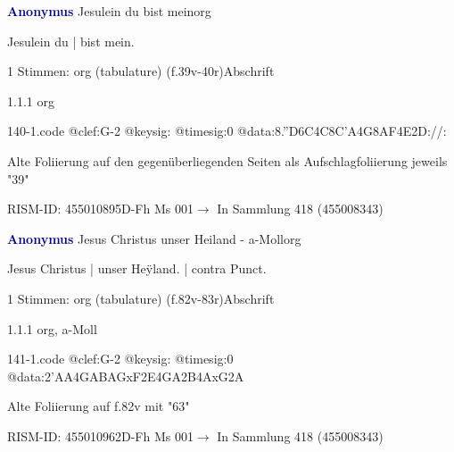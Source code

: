 \documentclass[twocolumn]{book}
\begin{document}
\par \vspace{7pt} \textcolor{darkblue}{\textbf{Anonymus  }}\hfillplus{\textbf{[140]}}\newline Jesulein du bist mein\newline org
\par \begin{itshape}[f.39v, at left:] Jesulein du | bist mein.\end{itshape} 
\par \textcolor{darkblue}{}  1 Stimmen: org (tabulature)  (f.39v-40r)\newline Abschrift
\par 1.1.1  org  
\begin{filecontents*}{140-1.code}
@clef:G-2
@keysig:
@timesig:0
@data:8.''D6C4C{8C'A}4G{8AF}4E2D://:
\end{filecontents*}
\newline
%
\par Alte Foliierung auf den gegenüberliegenden Seiten als Aufschlagfoliierung jeweils "39"
\par RISM-ID: 455010895\newline D-Fh  Ms 001\newline $\rightarrow$ In Sammlung 418 (455008343)
      
\par \vspace{7pt} \textcolor{darkblue}{\textbf{Anonymus  }}\hfillplus{\textbf{[141]}}\newline Jesus Christus unser Heiland - a-Moll\newline org
\par \begin{itshape}[f.82v, at left:] Jesus Christus | unser Heÿland. | contra Punct.\end{itshape} 
\par \textcolor{darkblue}{}  1 Stimmen: org (tabulature)  (f.82v-83r)\newline Abschrift
\par 1.1.1  org, a-Moll  
\begin{filecontents*}{141-1.code}
@clef:G-2
@keysig:
@timesig:0
@data:2'AA4GABAGxF2E4GA2B4AxG2A
\end{filecontents*}
\newline
%
\par Alte Foliierung auf f.82v mit "63"
\par RISM-ID: 455010962\newline D-Fh  Ms 001\newline $\rightarrow$ In Sammlung 418 (455008343)
      
\end{document}
